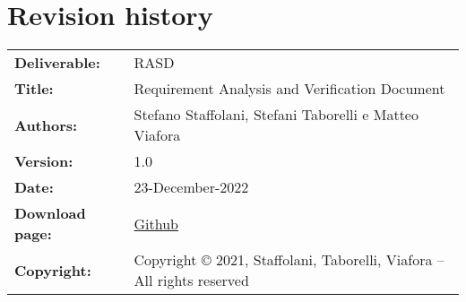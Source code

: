 \chapter{Revision history}

\begin{table}[h!]
\begin{tabu} to \textwidth { X[0.3,r,p] X[0.7,l,p] }
\hline

\textbf{Deliverable:} & RASD\\
\textbf{Title:} & Requirement Analysis and Verification Document \\
\textbf{Authors:} & Stefano Staffolani, Stefani Taborelli e Matteo Viafora \\
\textbf{Version:} & 1.0 \\ 
\textbf{Date:} & 23-December-2022 \\
\textbf{Download page:} & \href{https://github.com/ViaforaMatteo/StaffolaniTaborelliViafora}{Github} \\
\textbf{Copyright:} & Copyright © 2021, Staffolani, Taborelli, Viafora – All rights reserved \\
\hline
\end{tabu}
\end{table}
